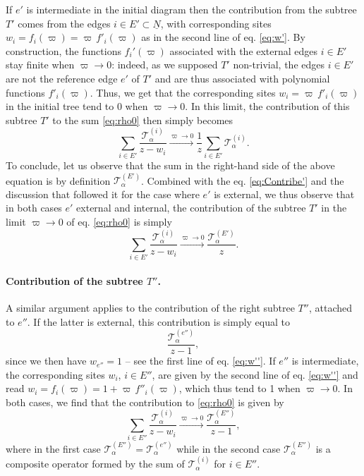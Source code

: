 \documentclass{article}
\begin{document}
If $e'$ is intermediate in the initial diagram then the contribution from the subtree $T'$ comes from the edges $i\in E' \subset \underline{N}$, with corresponding sites $w_{i} = f_i(\varpi) = \varpi\,f'_{i}(\varpi)$ as in the second line of eq. \eqref{eq:w'}. By construction, the functions $f_i'(\varpi)$ associated with the external edges $i\in E'$ stay finite when $\varpi\to0$: indeed, as we supposed $T'$ non-trivial, the edges $i\in E'$ are not the reference edge $e'$ of $T'$ and are thus associated with polynomial functions $f'_i(\varpi)$. Thus, we get that the corresponding sites $w_{i} = \varpi\,f'_{i}(\varpi)$ in the initial tree tend to 0 when $\varpi\to 0$. In this limit, the contribution of this subtree $T'$ to the sum \eqref{eq:rho0} then simply becomes
\begin{equation}
\sum_{i \in E'} \frac{\mathcal{T}_\alpha^{(i)}}{z-w_{i}} \xrightarrow{\varpi\to 0} \frac{1}{z} \sum_{i \in E'} \mathcal{T}_\alpha^{(i)}.
\end{equation}
To conclude, let us observe that the sum in the right-hand side of the above equation is by definition $\mathcal{T}_\alpha^{(E')}$. Combined with the eq. \eqref{eq:Contribe'} and the discussion that followed it for the case where $e'$ is external, we thus observe that in both cases $e'$ external and internal, the contribution of the subtree $T'$ in the limit $\varpi\to0$ of eq. \eqref{eq:rho0} is simply
\begin{equation}\label{eq:ContribE'}
\sum_{i \in E'} \frac{\mathcal{T}_\alpha^{(i)}}{z-w_{i}} \xrightarrow{\varpi\to 0} \frac{\mathcal{T}_\alpha^{(E')}}{z}.
\end{equation}

\paragraph{Contribution of the subtree $T''$.} A similar argument applies to the contribution of the right subtree $T''$, attached to $e''$. If the latter is external, this contribution is simply equal to
\begin{equation}
\frac{\mathcal{T}_\alpha^{(e'')}}{z-1},
\end{equation}
since we then have $w_{e''}=1$ -- see the first line of eq. \eqref{eq:w''}. If $e''$ is intermediate, the corresponding sites $w_{i}$, $i \in E''$, are given by the second line of eq. \eqref{eq:w''} and read $w_{i} = f_i(\varpi) = 1 + \varpi\,f''_{i}(\varpi)$, which thus tend to 1 when $\varpi \to 0$. In both cases, we find that the contribution to \eqref{eq:rho0} is given by
\begin{equation}\label{eq:ContribE''}
\sum_{i \in E''} \frac{\mathcal{T}_\alpha^{(i)}}{z-w_{i}} \xrightarrow{\varpi\to 0} \frac{\mathcal{T}_\alpha^{(E'')}}{z-1},
\end{equation} 
where in the first case $\mathcal{T}_\alpha^{(E'')}=\mathcal{T}_\alpha^{(e'')}$ while in the second case $\mathcal{T}_\alpha^{(E'')}$ is a composite operator formed by the sum of $\mathcal{T}_\alpha^{(i)}$ for $i\in E''$.
\end{document}

